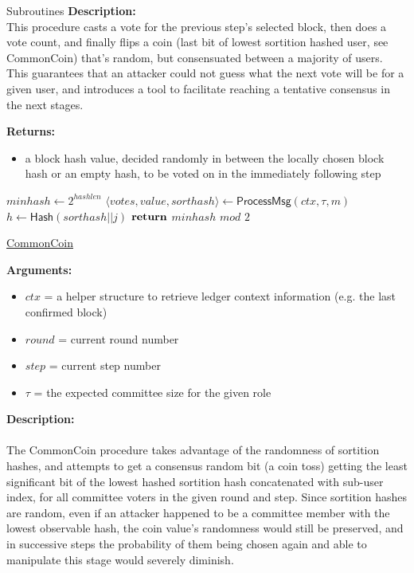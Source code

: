 \documentclass[10pt,a4paper]{article}
\begin{document}
\begin{section}{Subroutines}
\noindent \textbf{Description:}\\
This procedure casts a vote for the previous step's selected block, then does a vote count,
and finally flips a coin (last bit of lowest sortition hashed user, see CommonCoin) that's random,
but consensuated between a majority of users. This guarantees that an attacker could not guess what the
next vote will be for a given user, and introduces a tool to facilitate reaching a tentative consensus in the next stages.

\noindent \textbf{Returns:}
\begin{itemize}
    \item a block hash value, decided randomly in between the locally chosen block hash or an empty hash, to be voted on
    in the immediately following step
  \end{itemize}


\begin{algorithm}[H]
    \begin{algorithmic}[H]

    \State $minhash \gets 2^{hashlen}$
        \State $\langle votes,value,sorthash\rangle \gets \mathsf{ProcessMsg}(ctx,\tau,m)$
                \State $h \gets \mathsf{Hash}(sorthash||j)$
        \EndFor
    \EndFor
    $\Return$ $minhash$ $mod$ $2$
    \EndFunction
    \end{algorithmic}
    \caption{\underline{CommonCoin}}
\end{algorithm}


\noindent \textbf{Arguments:}
\begin{itemize}
    \item $ctx$ = a helper structure to retrieve ledger context information (e.g. the last confirmed block)
    \item $round$ = current round number
    \item $step$ = current step number
    \item $\tau$ = the expected committee size for the given role
  \end{itemize}

\noindent \textbf{Description:}\\\\
The CommonCoin procedure takes advantage of the randomness of sortition hashes, and attempts to
get a consensus random bit (a coin toss) getting the least significant bit of the lowest hashed
sortition hash concatenated with sub-user index, for all committee voters in the given round and step.
Since sortition hashes are random, even if an attacker happened to be a committee member with the lowest observable hash,
the coin value's randomness would still be preserved, and in successive steps the probability of them being chosen again and
able to manipulate this stage would severely diminish.\\


\end{section}
\end{document}
